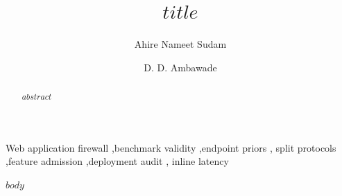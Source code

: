 \documentclass[preprint,11pt]{elsarticle}
\begin{document}
\begin{frontmatter}

\title{$title$}

\author[a]{Ahire Nameet Sudam}
\author[b]{D. D. Ambawade}
\address[a]{Department of Computer Engineering, Sardar Patel Institute of Technology, Munshi Nagar, Andheri (West), Mumbai 400058, Maharashtra, India}
\address[b]{Department of Computer Science and Engineering, Sardar Patel Institute of Technology, Munshi Nagar, Andheri (West), Mumbai 400058, Maharashtra, India}

\begin{abstract}
$abstract$
\end{abstract}

\begin{keyword}
Web application firewall \sep benchmark validity \sep endpoint priors \sep
split protocols \sep feature admission \sep deployment audit \sep
inline latency
\end{keyword}

\end{frontmatter}

$body$



\end{document}
